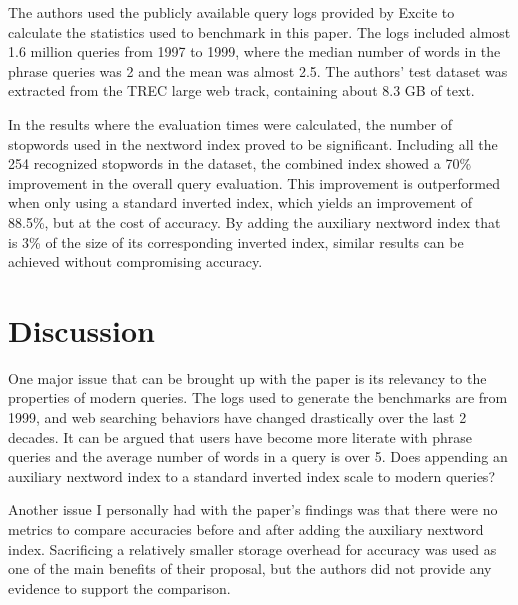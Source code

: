 \documentclass[11pt]{article}
\begin{document}
    The authors used the publicly available query logs provided by Excite to calculate the statistics used to benchmark in this paper. The logs included almost 1.6 million queries from 1997 to 1999, where the median number of words in the phrase queries was 2 and the mean was almost 2.5. The authors' test dataset was extracted from the TREC large web track, containing about 8.3 GB of text.

    In the results where the evaluation times were calculated, the number of stopwords used in the nextword index proved to be significant. Including all the 254 recognized stopwords in the dataset, the combined index showed a 70\% improvement in the overall query evaluation. This improvement is outperformed when only using a standard inverted index, which yields an improvement of 88.5\%, but at the cost of accuracy. By adding the auxiliary nextword index that is 3\% of the size of its corresponding inverted index, similar results can be achieved without compromising accuracy.

    \section*{Discussion}

    One major issue that can be brought up with the paper is its relevancy to the properties of modern queries. The logs used to generate the benchmarks are from 1999, and web searching behaviors have changed drastically over the last 2 decades. It can be argued that users have become more literate with phrase queries and the average number of words in a query is over 5. Does appending an auxiliary nextword index to a standard inverted index scale to modern queries?

    Another issue I personally had with the paper's findings was that there were no metrics to compare accuracies before and after adding the auxiliary nextword index. Sacrificing a relatively smaller storage overhead for accuracy was used as one of the main benefits of their proposal, but the authors did not provide any evidence to support the comparison.
\end{document}
